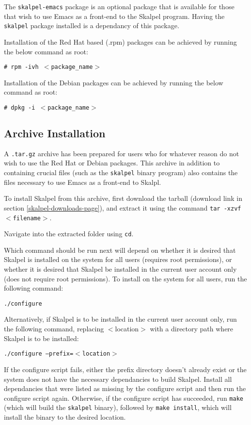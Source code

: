 \documentclass{report}
\begin{document}
The \texttt{skalpel-emacs} package is an optional package that is
available for those that wish to use Emacs as a front-end to the
Skalpel program. Having the \texttt{skalpel} package installed is a
dependancy of this package.

Installation of the Red Hat based (.rpm) packages can be achieved by
running the below command as root:

\texttt{\# rpm -ivh $<$package\_name$>$}

Installation of the Debian packages can be achieved by running the
below command as root:

\texttt{\# dpkg -i $<$package\_name$>$}

\subsection {Archive Installation}
\label{archive-installation}

A \texttt{.tar.gz} archive has been prepared for users who for
whatever reason do not wish to use the Red Hat or Debian
packages. This archive in addition to containing crucial files (such
as the \texttt{skalpel} binary program) also contains the files
necessary to use Emacs as a front-end to Skalpl.

To install Skalpel from this archive, first download the tarball
(download link in section \ref{skalpel-downloads-page}), and extract
it using the command \texttt{tar -xzvf $<$filename$>$}.

Navigate into the extracted folder using \texttt{cd}.

Which command should be run next will depend on whether it is desired
that Skalpel is installed on the system for all users (requires root
permissions), or whether it is desired that Skalpel be installed in the
current user account only (does not require root permissions). To
install on the system for all users, run the following command:

\texttt{./configure}

Alternatively, if Skalpel is to be installed in the current user
account only, run the following command, replacing
$<$location$>$ with a directory path where Skalpel is to be installed:

\texttt{./configure --prefix=$<$location$>$}

If the configure script fails, either the prefix directory doesn't
already exist or the system does not have the necessary dependancies
to build Skalpel. Install all dependancies that were listed as missing
by the configure script and then run the configure script
again. Otherwise, if the configure script has succeeded, run
\texttt{make} (which will build the \texttt{skalpel} binary), followed
by \texttt{make install}, which will install the binary to the desired
location.
\end{document}
